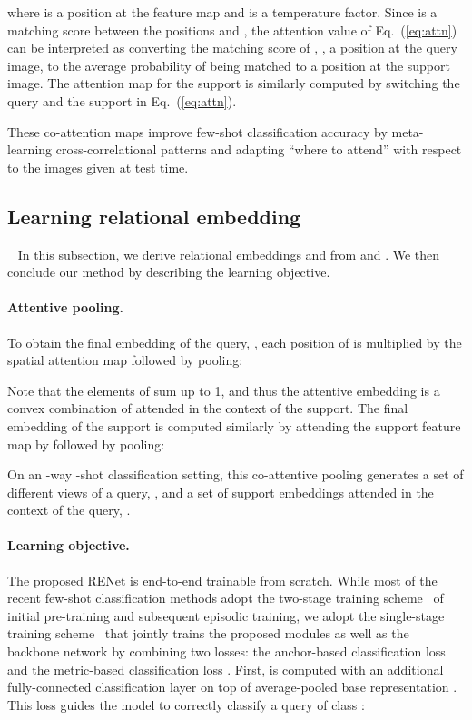 \documentclass[10pt,twocolumn,letterpaper]{article}
\newcommand{\ours}{RENet\xspace}
\begin{document}
where  is a position at the feature map and  is a temperature factor.
Since  is a matching score between the positions  and , the attention value  of Eq.~(\ref{eq:attn}) can be interpreted as converting the matching score of  , \ie, a position at the query image, to the average probability of  being matched to a position at the support image.
The attention map for the support  is similarly computed by switching the query and the support in Eq.~(\ref{eq:attn}).

These co-attention maps improve few-shot classification accuracy by meta-learning cross-correlational patterns and adapting ``where to attend'' with respect to the images given at test time.




\subsection{Learning relational embedding}~\label{sec_CORE}
In this subsection, we derive relational embeddings  and  from  and .
We then conclude our method by describing the learning objective.








\paragraph{Attentive pooling.}
To obtain the final embedding of the query, , each position of  is multiplied by the spatial attention map  followed by pooling:

Note that the elements of  sum up to 1, and thus the attentive embedding  is a convex combination of  attended in the context of the support.
The final embedding of the support is computed similarly by attending the support feature map  by  followed by pooling:

On an -way -shot classification setting, this co-attentive pooling generates a set of  different views of a query, , and a set of support embeddings attended in the context of the query, .








\paragraph{Learning objective.}
\label{sec:learning_objective}
The proposed \ours is end-to-end trainable from scratch.
While most of the recent few-shot classification methods adopt the two-stage training scheme~\cite{leo, frn, feat, deepemd} of initial pre-training and subsequent episodic training, we adopt the single-stage training scheme~\cite{can, tadam} that jointly trains the proposed modules as well as the backbone network by combining two losses: the anchor-based classification loss  and the metric-based classification loss .
First,  is computed with an additional fully-connected classification layer on top of average-pooled base representation .
This loss guides the model to correctly classify a query of class : 
\end{document}

